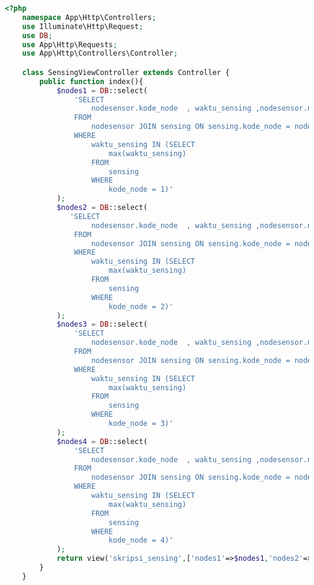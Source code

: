\begin{lstlisting}[language=PHP, caption=SensingViewController.php]
<?php
    namespace App\Http\Controllers;
    use Illuminate\Http\Request;
    use DB;
    use App\Http\Requests;
    use App\Http\Controllers\Controller;

    class SensingViewController extends Controller {
        public function index(){
            $nodes1 = DB::select(
                'SELECT 
                    nodesensor.kode_node  , waktu_sensing ,nodesensor.nama_node,ph_tanah,kelembaban_tanah,suhu_tanah,suhu_udara 
                FROM
                    nodesensor JOIN sensing ON sensing.kode_node = nodesensor.kode_node JOIN tanah ON tanah.id_Tanah = nodesensor.kode_node
                WHERE
                    waktu_sensing IN (SELECT 
                        max(waktu_sensing)
                    FROM
                        sensing
                    WHERE
                        kode_node = 1)'
            );
            $nodes2 = DB::select(
               'SELECT 
                    nodesensor.kode_node  , waktu_sensing ,nodesensor.nama_node,ph_tanah,kelembaban_tanah,suhu_tanah,suhu_udara 
                FROM
                    nodesensor JOIN sensing ON sensing.kode_node = nodesensor.kode_node JOIN tanah ON tanah.id_Tanah = nodesensor.kode_node
                WHERE
                    waktu_sensing IN (SELECT 
                        max(waktu_sensing)
                    FROM
                        sensing
                    WHERE
                        kode_node = 2)'
            );
            $nodes3 = DB::select(
                'SELECT 
                    nodesensor.kode_node  , waktu_sensing ,nodesensor.nama_node,ph_tanah,kelembaban_tanah,suhu_tanah,suhu_udara 
                FROM
                    nodesensor JOIN sensing ON sensing.kode_node = nodesensor.kode_node JOIN tanah ON tanah.id_Tanah = nodesensor.kode_node
                WHERE
                    waktu_sensing IN (SELECT 
                        max(waktu_sensing)
                    FROM
                        sensing
                    WHERE
                        kode_node = 3)'
            );
            $nodes4 = DB::select(
                'SELECT 
                    nodesensor.kode_node  , waktu_sensing ,nodesensor.nama_node,ph_tanah,kelembaban_tanah,suhu_tanah,suhu_udara 
                FROM
                    nodesensor JOIN sensing ON sensing.kode_node = nodesensor.kode_node JOIN tanah ON tanah.id_Tanah = nodesensor.kode_node
                WHERE
                    waktu_sensing IN (SELECT 
                        max(waktu_sensing)
                    FROM
                        sensing
                    WHERE
                        kode_node = 4)'
            );
            return view('skripsi_sensing',['nodes1'=>$nodes1,'nodes2'=>$nodes2,'nodes3'=>$nodes3,'nodes4'=>$nodes4]); 
        }
    }
\end{lstlisting}


%  



